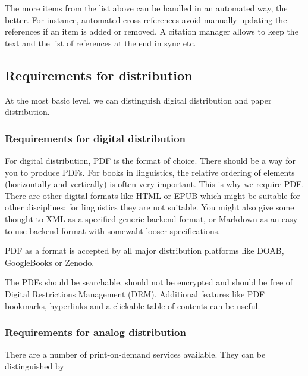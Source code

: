 \documentclass[guidelines,nonflat,modfonts] {langsci/langscibook}
\begin{document}
The more items from the list above can be handled in an automated way, the better. For instance, automated cross-references avoid manually updating the references if an item is added or removed. A citation manager allows to keep the text and the list of references at the end in sync etc. 
                        
                        
                        
\subsection{Requirements for distribution}
At the most basic level, we can distinguish digital distribution and paper distribution. 

\subsubsection{Requirements for digital distribution}
For digital distribution, PDF is the format of choice. There should be a way for you to produce PDFs.  For books in linguistics, the relative ordering of elements (horizontally and vertically) is often very important. This is why we require PDF. There are other digital formats like HTML or EPUB which might be suitable for other disciplines; for linguistics they are not suitable. You might also give some thought to XML as a specified generic backend format, or Markdown as an easy-to-use backend format with somewaht looser specifications. 

PDF as a format is accepted by all major distribution platforms like DOAB, GoogleBooks or Zenodo. 
 

The PDFs should be searchable, should not be encrypted and should be free of Digital Restrictions Management (DRM). Additional features like PDF bookmarks, hyperlinks and a clickable table of contents can be useful. 

\subsubsection{Requirements for analog distribution}
There are a number of print-on-demand services available. They can be distinguished by 
\end{document}
